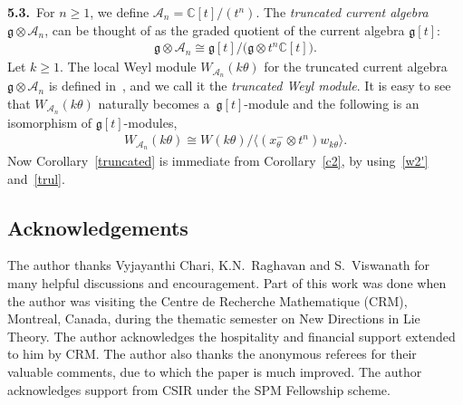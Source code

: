 \documentclass[pdftex]{sigma}
\numberwithin{equation}{section}
\begin{document}
{\bf 5.3.}~For $n\geq 1$, we def\/ine $\mathcal{A}_n= \mathbb{C}[t]/(t^{n})$.
The {\em truncated current algebra} $\mathfrak{g}\otimes \mathcal{A}_n$, can be thought of as the graded quotient of the
current algebra $\mathfrak{g}[t]$:
\begin{gather*}
\mathfrak{g}\otimes \mathcal{A}_n\cong\mathfrak{g}[t]/\big(\mathfrak{g}\otimes t^n \mathbb{C}[t]\big).
\end{gather*}
Let $k\geq1$.
The local Weyl module $W_{\mathcal{A}_n}(k\theta)$ for the truncated current algebra $\mathfrak{g}\otimes \mathcal{A}_n$
is def\/ined in~\cite{CFK}, and we call it the {\em truncated Weyl module}.
It is easy to see that $W_{\mathcal{A}_n}(k\theta)$ naturally becomes a~$\mathfrak{g}[t]$-module and the following is an
isomorphism of $\mathfrak{g}[t]$-modules,
\begin{gather}
\label{trul}
W_{\mathcal{A}_n}(k\theta) \cong  W(k\theta)/\langle (x^{-}_{\theta}\otimes t^{n})  w_{k\theta}\rangle.
\end{gather}
Now Corollary~\ref{truncated} is immediate from Corollary~\ref{c2}, by using~\eqref{w2'} and~\eqref{trul}.

\subsection*{Acknowledgements}

The author thanks Vyjayanthi Chari, K.N.~Raghavan and S.~Viswanath for many helpful discussions and encouragement.
Part of this work was done when the author was visiting the Centre de Recherche Mathematique (CRM), Montreal, Canada,
during the thematic semester on New Directions in Lie Theory.
The author acknowledges the hospitality and f\/inancial support extended to him by CRM.
The author also thanks the anonymous referees for their valuable comments, due to which the paper is much improved.
The author acknowledges support from CSIR under the SPM Fellowship scheme.
\end{document}
